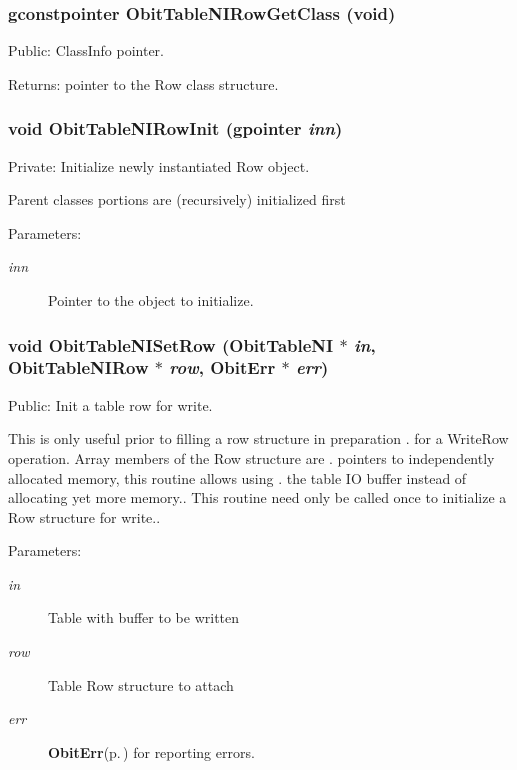 \subsubsection{\setlength{\rightskip}{0pt plus 5cm}gconstpointer Obit\-Table\-NIRow\-Get\-Class (void)}\label{ObitTableNI_8c_a15}


Public: Class\-Info pointer. 

\begin{Desc}
\item[Returns:]pointer to the Row class structure. \end{Desc}
\subsubsection{\setlength{\rightskip}{0pt plus 5cm}void Obit\-Table\-NIRow\-Init (gpointer {\em inn})}\label{ObitTableNI_8c_a6}


Private: Initialize newly instantiated Row object. 

Parent classes portions are (recursively) initialized first \begin{Desc}
\item[Parameters:]
\begin{description}
\item[{\em inn}]Pointer to the object to initialize. \end{description}
\end{Desc}
\subsubsection{\setlength{\rightskip}{0pt plus 5cm}void Obit\-Table\-NISet\-Row ({\bf Obit\-Table\-NI} $\ast$ {\em in}, {\bf Obit\-Table\-NIRow} $\ast$ {\em row}, {\bf Obit\-Err} $\ast$ {\em err})}\label{ObitTableNI_8c_a23}


Public: Init a table row for write. 

This is only useful prior to filling a row structure in preparation . for a Write\-Row operation. Array members of the Row structure are . pointers to independently allocated memory, this routine allows using . the table IO buffer instead of allocating yet more memory.. This routine need only be called once to initialize a Row structure for write.. \begin{Desc}
\item[Parameters:]
\begin{description}
\item[{\em in}]Table with buffer to be written \item[{\em row}]Table Row structure to attach \item[{\em err}]{\bf Obit\-Err}{\rm (p.\,\pageref{structObitErr})} for reporting errors. \end{description}
\end{Desc}
